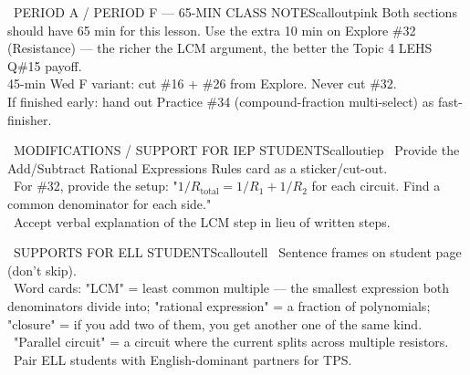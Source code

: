 \documentclass[11pt]{article}
\begin{document}
\clearpage

\begin{callout}{\IconClock\ PERIOD A / PERIOD F --- 65-MIN CLASS NOTES}{calloutpink}
Both sections should have 65 min for this lesson. Use the extra 10 min on Explore \#32 (Resistance) --- the richer the LCM argument, the better the Topic 4 LEHS Q\#15 payoff.\\
45-min Wed F variant: cut \#16 + \#26 from Explore. Never cut \#32.\\
If finished early: hand out Practice \#34 (compound-fraction multi-select) as fast-finisher.
\end{callout}

\begin{callout}{\IconPuzzle\ MODIFICATIONS / SUPPORT FOR IEP STUDENTS}{calloutiep}
\textbullet\ Provide the Add/Subtract Rational Expressions Rules card as a sticker/cut-out.\\
\textbullet\ For \#32, provide the setup: "\(1/R_{\text{total}} = 1/R_1 + 1/R_2\) for each circuit. Find a common denominator for each side."\\
\textbullet\ Accept verbal explanation of the LCM step in lieu of written steps.
\end{callout}

\begin{callout}{\IconGlobe\ SUPPORTS FOR ELL STUDENTS}{calloutell}
\textbullet\ Sentence frames on student page (don't skip).\\
\textbullet\ Word cards: "LCM" = least common multiple --- the smallest expression both denominators divide into; "rational expression" = a fraction of polynomials; "closure" = if you add two of them, you get another one of the same kind.\\
\textbullet\ "Parallel circuit" = a circuit where the current splits across multiple resistors.\\
\textbullet\ Pair ELL students with English-dominant partners for TPS.
\end{callout}
\end{document}
